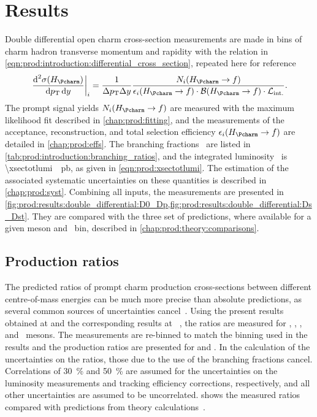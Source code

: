 \chapter{Results}
\label{chap:prod:results}

Double differential open charm cross-section measurements are made in bins of 
charm hadron transverse momentum and rapidity with the relation in 
\cref{eqn:prod:introduction:differential_cross_section}, repeated here for 
reference
\begin{equation*}
  \left.\frac{\dif^{2}{\xsec(\PHc)}}{\dif{\pT}\dif{\rapidity}}\right\rvert_{i}
    = \frac{1}{\Delta\pT\Delta\rapidity}
      \frac{%
        N_{i}(\HcTof)
      }{%
        \eff_{i}(\HcTof)\cdot\bfrac(\HcTof)\cdot\intlumi
      }.
\end{equation*}
The prompt signal yields $N_{i}(\HcTof)$ are measured with the maximum 
likelihood fit described in \cref{chap:prod:fitting}, and the measurements of 
the acceptance, reconstruction, and total selection efficiency 
$\eff_{i}(\HcTof)$ are detailed in \cref{chap:prod:effs}.
The branching fractions \bfrac\ are listed in 
\cref{tab:prod:introduction:branching_ratios}, and the integrated luminosity 
\intlumi\ is \SI{\xsectotlumi}{\per\pico\barn}, as given in 
\cref{eqn:prod:xsectotlumi}.
The estimation of the associated systematic uncertainties on these quantities 
is described in \cref{chap:prod:syst}.
Combining all inputs, the measurements are presented in 
\cref{fig:prod:results:double_differential:D0_Dp,fig:prod:results:double_differential:Ds_Dst}.
They are compared with the three set of predictions, where available for a 
given meson and \pTy\ bin, described in \cref{chap:prod:theory:comparisons}.

\section{Production ratios}
\label{chap:prod:results:ratios}

The predicted ratios of prompt charm production cross-sections between 
different centre-of-mass energies can be much more precise than absolute 
predictions, as several common sources of uncertainties 
cancel~\cite{Gauld:2015yia,Cacciari:2015fta,Kniehl:2012ti}.
Using the present results obtained at  and the corresponding 
results at ~\cite{LHCb-PAPER-2012-041}, the ratios 
 are measured for \PDzero, \PDplus, \PDsplus, and \PDstarp\ 
mesons.
The  measurements are re-binned to match the binning used in the 
\sqrtseq{7} results and the production ratios are presented for \pTrange{0}{8} 
and \yrange{2}{4.5}.
In the calculation of the uncertainties on the ratios, those due to the use of 
the branching fractions cancel.
Correlations of \SI{30}{\percent} and \SI{50}{\percent} are assumed for the 
uncertainties on the luminosity measurements and tracking efficiency 
corrections, respectively, and all other uncertainties are assumed to be 
uncorrelated.
 shows the measured ratios compared with 
predictions from theory 
calculations~\cite{Gauld:2015yia,Cacciari:2015fta,Kniehl:2012ti}.

